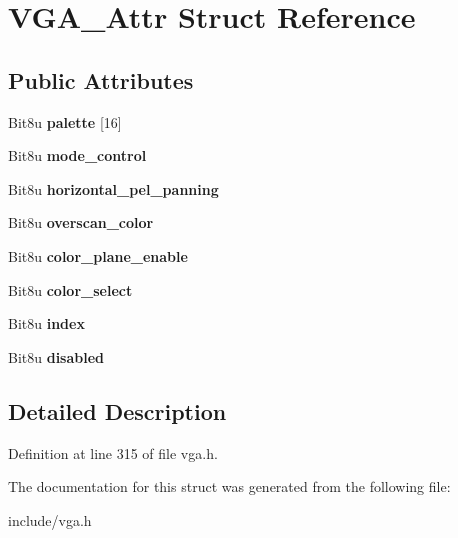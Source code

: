 \hypertarget{structVGA__Attr}{\section{V\-G\-A\-\_\-\-Attr Struct Reference}
\label{structVGA__Attr}
}
\subsection*{Public Attributes}
\begin{DoxyCompactItemize}
\item 
\hypertarget{structVGA__Attr_ad99b88df8836cef9a71a302eef58c6bc}{Bit8u {\bfseries palette} \mbox{[}16\mbox{]}}\label{structVGA__Attr_ad99b88df8836cef9a71a302eef58c6bc}

\item 
\hypertarget{structVGA__Attr_a1b1f9b873cb25af5b2258157ec294b67}{Bit8u {\bfseries mode\-\_\-control}}\label{structVGA__Attr_a1b1f9b873cb25af5b2258157ec294b67}

\item 
\hypertarget{structVGA__Attr_a57f5441e85ade86c8ac8a47db2eee8a6}{Bit8u {\bfseries horizontal\-\_\-pel\-\_\-panning}}\label{structVGA__Attr_a57f5441e85ade86c8ac8a47db2eee8a6}

\item 
\hypertarget{structVGA__Attr_a8728e17ec288d51e4b915af094916daa}{Bit8u {\bfseries overscan\-\_\-color}}\label{structVGA__Attr_a8728e17ec288d51e4b915af094916daa}

\item 
\hypertarget{structVGA__Attr_a87dc770222aa6ab0f30f1dd2288be390}{Bit8u {\bfseries color\-\_\-plane\-\_\-enable}}\label{structVGA__Attr_a87dc770222aa6ab0f30f1dd2288be390}

\item 
\hypertarget{structVGA__Attr_abf6a172f77c5af11b8fe91047af55b98}{Bit8u {\bfseries color\-\_\-select}}\label{structVGA__Attr_abf6a172f77c5af11b8fe91047af55b98}

\item 
\hypertarget{structVGA__Attr_a068d49ae844631d0e0863fbaa6c82df4}{Bit8u {\bfseries index}}\label{structVGA__Attr_a068d49ae844631d0e0863fbaa6c82df4}

\item 
\hypertarget{structVGA__Attr_a6c14506b028f7cdc1b0b57bd2bbf57e2}{Bit8u {\bfseries disabled}}\label{structVGA__Attr_a6c14506b028f7cdc1b0b57bd2bbf57e2}

\end{DoxyCompactItemize}


\subsection{Detailed Description}


Definition at line 315 of file vga.\-h.



The documentation for this struct was generated from the following file\-:\begin{DoxyCompactItemize}
\item 
include/vga.\-h\end{DoxyCompactItemize}
